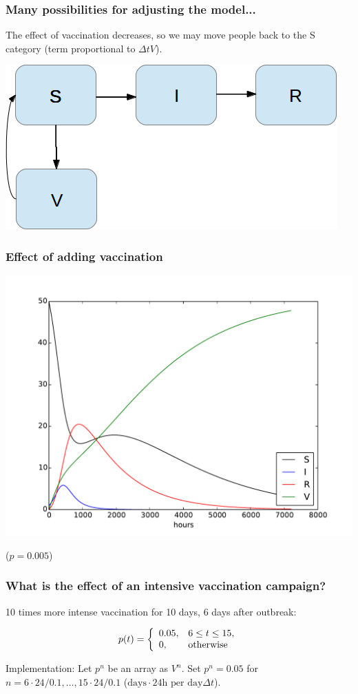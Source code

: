 \documentclass{beamer}
\begin{document}
\begin{frame}
\frametitle{Many possibilities for adjusting the model...}

The effect of vaccination decreases, so we may move people back to
the S category (term proportional to $\Delta t V$).


\begin{center}  %
  \centerline{\includegraphics[width=0.7\linewidth]{fig/categories_SIRV_feedback.png}}
\end{center}
\end{frame}

\begin{frame}
\frametitle{Effect of adding vaccination}

\begin{center}  %
  \centerline{\includegraphics[width=0.8\linewidth]{fig/SIRV1.pdf}}
\end{center}


($p=0.005$)
\end{frame}

\begin{frame}
\frametitle{What is the effect of an intensive vaccination campaign?}

10 times more intense vaccination for 10 days, 6 days after outbreak:

\begin{equation*} p(t) = \left\lbrace\begin{array}{ll}
0.05,& 6\leq t\leq 15,\\
0,& \hbox{otherwise} \end{array}\right.\end{equation*}

Implementation: Let $p^n$ be an array as $V^n$. Set $p^n=0.05$ for
$n=6\cdot 24/0.1,\ldots, 15\cdot 24/0.1$ ($\mbox{days}\cdot 24 \mbox{h per
day}\Delta t$).
\end{frame}
\end{document}
